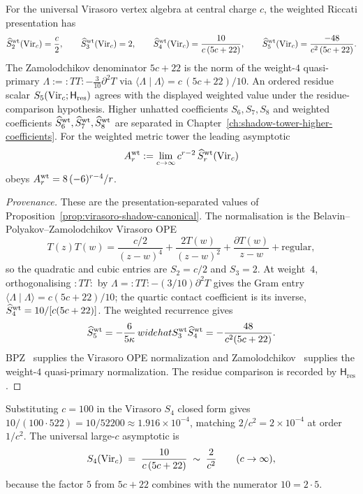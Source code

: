 \begin{proposition}[Virasoro weighted-Riccati seeds through $r = 5$]
\label{prop:vir-shadow-r5}
\ClaimStatusConditional
For the universal Virasoro vertex algebra at central charge $c$, the
weighted Riccati presentation has
\[
\widehat S^{\rm wt}_2(\mathrm{Vir}_c) = \frac{c}{2},
\qquad
\widehat S^{\rm wt}_3(\mathrm{Vir}_c) = 2,
\qquad
\widehat S^{\rm wt}_4(\mathrm{Vir}_c) = \frac{10}{c\,(5c+22)},
\qquad
\widehat S^{\rm wt}_5(\mathrm{Vir}_c) = \frac{-48}{c^{2}\,(5c+22)}.
\]
The Zamolodchikov denominator $5c+22$ is the norm of the weight-$4$
quasi-primary
$\Lambda := {:}TT{:} - \tfrac{3}{10}\partial^{2}T$ via
$\langle \Lambda \mid \Lambda \rangle = c\,(5c+22)/10$.  An
ordered residue scalar $S_5(\mathrm{Vir}_c;\mathsf H_{\mathrm{res}})$ agrees
with the displayed weighted value under the residue-comparison
hypothesis. Higher unhatted coefficients $S_6, S_7, S_8$ and weighted coefficients
$\widehat S^{\rm wt}_6,\widehat S^{\rm wt}_7,\widehat S^{\rm wt}_8$
are separated in Chapter~\ref{ch:shadow-tower-higher-coefficients}.
For the weighted metric tower the leading asymptotic
\[
A^{\rm wt}_r := \lim_{c\to\infty} c^{r-2}\,
\widehat S^{\rm wt}_r(\mathrm{Vir}_c)
\]
obeys $A^{\rm wt}_r = 8\,(-6)^{r-4}/r$.
\end{proposition}

\begin{proof}[Provenance]
These are the presentation-separated values of
Proposition~\ref{prop:virasoro-shadow-canonical}. The normalisation is
the Belavin--Polyakov--Zamolodchikov Virasoro OPE
\[
T(z)T(w)=\frac{c/2}{(z-w)^4}
 +\frac{2T(w)}{(z-w)^2}
 +\frac{\partial T(w)}{z-w}+\text{regular},
\]
so the quadratic and cubic entries are $S_2=c/2$ and $S_3=2$. At
weight~$4$, orthogonalising ${:}TT{:}$ by
$\Lambda={:}TT{:}-(3/10)\partial^2T$ gives the Gram entry
$\langle\Lambda\mid\Lambda\rangle=c(5c+22)/10$; the quartic contact
coefficient is its inverse,
$\widehat S^{\rm wt}_4=10/[c(5c+22)]$. The weighted recurrence gives
\[
 \widehat S^{\rm wt}_5
 =-\frac{6}{5\kappa}\,widehat S^{\rm wt}_3
   \widehat S^{\rm wt}_4
 =-\frac{48}{c^2(5c+22)}.
\]
BPZ~\cite{BPZ84} supplies the Virasoro OPE normalization and
Zamolodchikov~\cite{Zamolodchikov1985} supplies the weight-$4$
quasi-primary normalization.  The residue comparison is recorded by
$\mathsf H_{\mathrm{res}}$.
\end{proof}

\begin{remark}
\label{rem:s4-large-c-normalization}
Substituting $c = 100$ in the Virasoro $S_4$ closed form gives
$10/(100 \cdot 522) = 10/52200 \approx 1.916 \times 10^{-4}$,
matching $2/c^{2} = 2 \times 10^{-4}$ at order $1/c^{2}$. The
universal large-$c$ asymptotic is
\[
S_4(\mathrm{Vir}_c) \;=\; \frac{10}{c\,(5c+22)}
\;\sim\; \frac{2}{c^{2}}
\qquad (c \to \infty),
\]
because the factor $5$ from $5c+22$ combines with the numerator
$10=2\cdot5$.
\end{remark}

